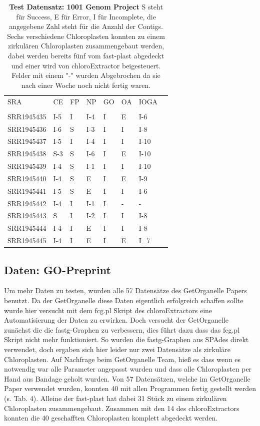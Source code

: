 \documentclass{scrartcl}
\begin{document}
\begin{table}[!h]
\caption[Test Datensatz: 1001 Genom Project, 11 Datensätze]{\textbf{Test Datensatz: 1001 Genom Project} S steht für Success, E für Error, I für Incomplete, die angegebene Zahl steht für die Anzahl der Contigs. Sechs verschiedene Chloroplasten konnten zu einem zirkulären Chloroplasten zusammengebaut werden, dabei werden bereits fünf vom fast-plast abgedeckt und einer wird von chloroExtractor beigesteuert. Felder mit einem "-" wurden Abgebrochen da sie nach einer Woche noch nicht fertig waren.}

\begin{center}
\begin{tabular}{llllllll}
SRA & CE & FP & NP & GO & OA & IOGA & \\
 &  &  &  &  &  &  & \\
\hline
SRR1945435 & I-5 & I & I-4 & I & E & I-6 & \\
SRR1945436 & I-6 & S & I-3 & I & I & I-8 & \\
SRR1945437 & I-5 & I & I-4 & I & I & I-10 & \\
SRR1945438 & S-3 & S & I-6 & I & E & I-10 & \\
SRR1945439 & I-4 & S & I-1 & I & I & I-10 & \\
SRR1945440 & I-4 & S & E & I & E & I-9 & \\
SRR1945441 & I-5 & S & E & I & I & I-6 & \\
SRR1945442 & I-4 & I & I-1 & I & - & - & \\
SRR1945443 & S & I & I-2 & I & I & I-8 & \\
SRR1945444 & I-4 & I & E & I & I & I-8 & \\
SRR1945445 & I-4 & I & E & I & E & I\_7 & \\
\end{tabular}
\end{center}
\end{table}

\subsection{Daten: GO-Preprint}
\label{sec-4-4}
Um mehr Daten zu testen, wurden alle 57 Datensätze des GetOrganelle Papers \footnotemark[22]{} benutzt. Da der GetOrganelle diese Daten eigentlich erfolgreich schaffen sollte
wurde hier versucht mit dem fcg.pl Skript des chloroExtractors eine Automatisierung der Daten zu erwirken. Doch versucht der GetOrganelle zunächst die die fastg-Graphen
zu verbessern, dies führt dazu dass das fcg.pl Skript nicht mehr funktioniert. So wurden die fastg-Graphen aus SPAdes direkt verwendet, doch ergaben sich hier leider nur
zwei Datensätze als zirkuläre Chloroplasten. Auf Nachfrage beim GetOrganelle Team, hieß es dass wenn es notwendig war alle Parameter angepasst wurden und dass alle 
Chloroplasten per Hand aus Bandage geholt wurden. 
Von 57 Datensätzen, welche im GetOrganelle Paper verwendet wurden, konnten 40 mit allen Programmen fertig gestellt werden (s. Tab. 4).
Alleine der fast-plast hat dabei 31 Stück zu einem zirkulären Chloroplasten zusammengebaut. Zusammen mit den 14 des chloroExtractors
konnten die 40 geschafften Chloroplasten komplett abgedeckt werden.
\end{document}
